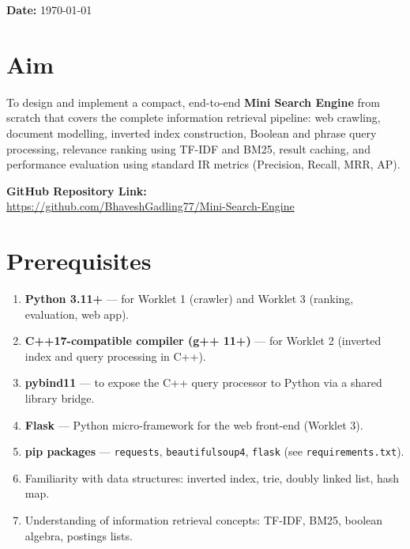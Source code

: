 \documentclass[12pt]{article}
\begin{document}
\begin{titlepage}
\vspace{0.4cm}
{\textbf{Date:} \today}

\vfill


\end{titlepage}


\newpage

\section*{Aim}

To design and implement a compact, end-to-end \textbf{Mini Search Engine} from scratch that covers the complete information retrieval pipeline: web crawling, document modelling, inverted index construction, Boolean and phrase query processing, relevance ranking using TF-IDF and BM25, result caching, and performance evaluation using standard IR metrics (Precision, Recall, MRR, AP).

\vspace{0.3cm}
\noindent\textbf{GitHub Repository Link:}\\
\url{https://github.com/BhaveshGadling77/Mini-Search-Engine}

\section*{Prerequisites}

\begin{enumerate}
    \item \textbf{Python 3.11+} --- for Worklet 1 (crawler) and Worklet 3 (ranking, evaluation, web app).
    \item \textbf{C++17-compatible compiler (g++ 11+)} --- for Worklet 2 (inverted index and query processing in C++).
    \item \textbf{pybind11} --- to expose the C++ query processor to Python via a shared library bridge.
    \item \textbf{Flask} --- Python micro-framework for the web front-end (Worklet 3).
    \item \textbf{pip packages} --- \texttt{requests}, \texttt{beautifulsoup4}, \texttt{flask} (see \texttt{requirements.txt}).
    \item Familiarity with data structures: inverted index, trie, doubly linked list, hash map.
    \item Understanding of information retrieval concepts: TF-IDF, BM25, boolean algebra, postings lists.
\end{enumerate}
\end{document}
